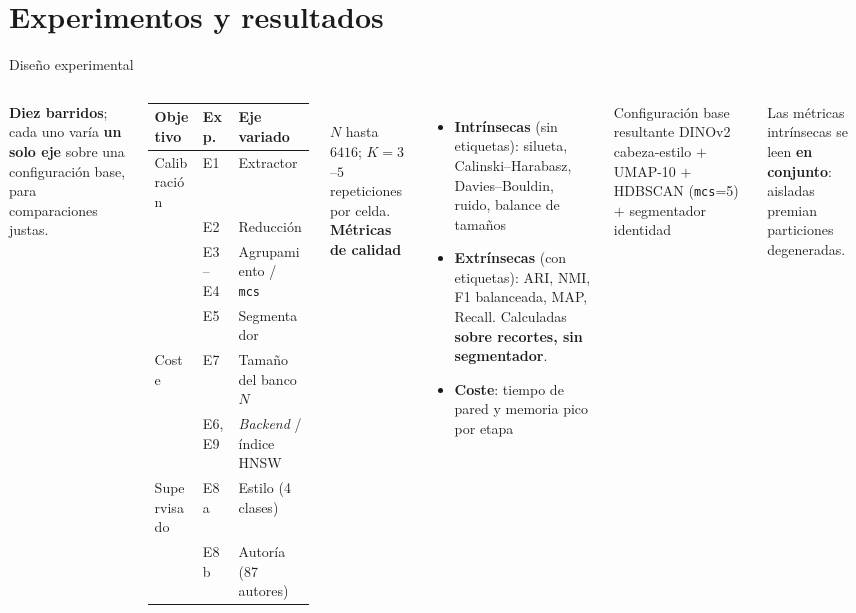 \documentclass[aspectratio=1610]{beamer}
\begin{document}
\section{Experimentos y resultados}

\begin{frame}{Diseño experimental}
  \begin{columns}[t]
      \small
      \textbf{Diez barridos}; cada uno varía \textbf{un solo eje} sobre una configuración base, para comparaciones justas.\\[0.5em]
      \vspace{0.2em}
      \footnotesize
      \begin{tabular}{lll}
        \toprule
        \textbf{Objetivo} & \textbf{Exp.} & \textbf{Eje variado} \\
        \midrule
        Calibración & E1 & Extractor \\
                    & E2 & Reducción \\
                    & E3--E4 & Agrupamiento / \texttt{mcs} \\
                    & E5 & Segmentador \\
        \midrule
        Coste       & E7 & Tamaño del banco $N$ \\
                    & E6, E9 & \textit{Backend} / índice HNSW \\
        \midrule
        Supervisado & E8a & Estilo (4 clases) \\
                    & E8b & Autoría (87 autores) \\
        \bottomrule
      \end{tabular}
      \vspace{0.4em}\\
      {\scriptsize $N$ hasta $6416$; $K{=}3$--$5$ repeticiones por celda.}
      \small
      \textbf{Métricas de calidad}
      \begin{itemize}\footnotesize
        \item \textbf{Intrínsecas} (sin etiquetas): silueta,
            Calinski--Harabasz, Davies--Bouldin, ruido, balance de tamaños
        \item \textbf{Extrínsecas} (con etiquetas): ARI, NMI, F1 balanceada,
            MAP, Recall. Calculadas \textbf{sobre recortes, sin segmentador}.
        \item \textbf{Coste}: tiempo de pared y memoria pico por etapa
      \end{itemize}
      \vspace{0.3em}
      \begin{block}{\footnotesize Configuración base resultante}
        {\footnotesize DINOv2 cabeza-estilo $+$ UMAP-10 $+$ HDBSCAN
         (\texttt{mcs}=5) $+$ segmentador identidad}
      \end{block}
      {\footnotesize Las métricas intrínsecas se leen \textbf{en conjunto}: aisladas premian particiones degeneradas.}
  \end{columns}
\end{frame}
\end{document}
